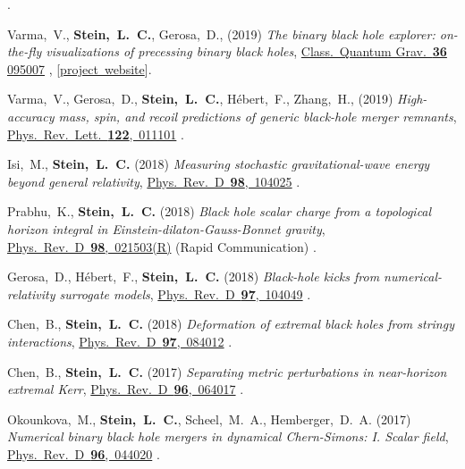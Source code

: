 \begin{etaremune}[start=\value{pubCounter}]
  .
\item
  Varma,~V., {\bf Stein,~L.~C.}, Gerosa,~D.,
  (2019)
  {\it The binary black hole explorer: on-the-fly visualizations of precessing binary black holes},
  \href{https://doi.org/10.1088/1361-6382/ab0ee9}{Class.~Quantum Grav.~{\bf 36} 095007}
  ,
  [\href{https://vijayvarma392.github.io/binaryBHexp/}{project~website}].
\item
  Varma,~V., Gerosa,~D., {\bf Stein,~L.~C.}, H\'ebert,~F.,  Zhang,~H.,
  (2019)
  {\it High-accuracy mass, spin, and recoil predictions of generic black-hole merger remnants},
  \href{https://doi.org/10.1103/PhysRevLett.122.011101}{Phys.~Rev.~Lett.~{\bf 122},~011101}
  .
\item
  Isi,~M., {\bf Stein,~L.~C.}
  (2018)
  {\it Measuring stochastic gravitational-wave energy beyond general relativity},
  \href{https://doi.org/10.1103/PhysRevD.98.104025}{Phys.~Rev.~D~{\bf 98},~104025}
  .
\item
  Prabhu,~K., {\bf Stein,~L.~C.}
  (2018)
  {\it Black hole scalar charge from a topological horizon integral in
    Einstein-dilaton-Gauss-Bonnet gravity},
  \href{https://doi.org/10.1103/PhysRevD.98.021503}{Phys.~Rev.~D~{\bf 98},~021503(R)}
  (Rapid Communication)
  .
\item
  Gerosa,~D., H\'ebert,~F., {\bf Stein,~L.~C.}
  (2018)
  {\it Black-hole kicks from numerical-relativity surrogate models},
  \href{https://doi.org/10.1103/PhysRevD.97.104049}{Phys.~Rev.~D~{\bf 97},~104049}
  .
\item
  Chen,~B., {\bf Stein,~L.~C.}
  (2018)
  {\it Deformation of extremal black holes from stringy interactions},
  \href{https://doi.org/10.1103/PhysRevD.97.084012}{Phys.~Rev.~D~{\bf 97},~084012}
  .
\item
  Chen,~B., {\bf Stein,~L.~C.}
  (2017)
  {\it Separating metric perturbations in near-horizon extremal Kerr},
  \href{https://doi.org/10.1103/PhysRevD.96.064017}{Phys.~Rev.~D~{\bf 96},~064017}
  .
\item
  Okounkova,~M.,
  {\bf Stein,~L.~C.},
  Scheel,~M.~A.,
  Hemberger,~D.~A.
  (2017)
  {\it Numerical binary black hole mergers in dynamical Chern-Simons:
    I. Scalar field},
  \href{https://doi.org/10.1103/PhysRevD.96.044020}{Phys.~Rev.~D~{\bf 96},~044020}
  .

\end{etaremune}
